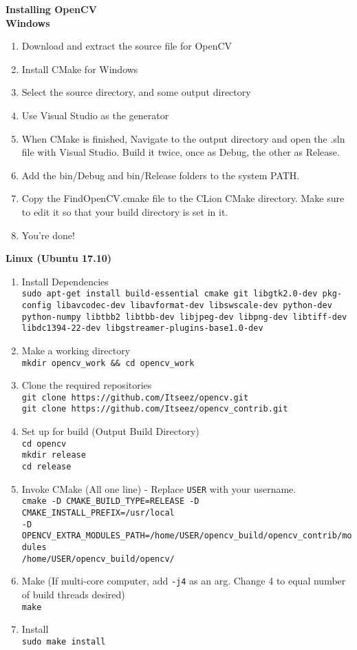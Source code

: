 \documentclass[11pt,letterpaper]{article}
\begin{document}
	\noindent\textbf{Installing OpenCV}\\
	\textbf{Windows}
	\begin{enumerate}
		\item Download and extract the source file for OpenCV
		\item Install CMake for Windows 
		\item Select the source directory, and some output directory
		\item Use Visual Studio as the generator
		\item When CMake is finished, Navigate to the output directory and open the .sln file with Visual Studio. Build it twice, once as Debug, the other as Release. 
		\item Add the bin/Debug and bin/Release folders to the system PATH. 
		\item Copy the FindOpenCV.cmake file to the CLion CMake directory. Make sure to edit it so that your build directory is set in it.
		\item You're done!
	\end{enumerate}
	\textbf{Linux (Ubuntu 17.10)}
	\begin{enumerate}
		\item Install Dependencies\\
		\texttt{sudo apt-get install build-essential cmake git libgtk2.0-dev pkg-config libavcodec-dev libavformat-dev libswscale-dev python-dev python-numpy libtbb2 libtbb-dev libjpeg-dev libpng-dev libtiff-dev libdc1394-22-dev libgstreamer-plugins-base1.0-dev}
		\item Make a working directory\\
		\texttt{mkdir opencv\_work \&\& cd opencv\_work}
		\item Clone the required repositories\\
		\texttt{git clone https://github.com/Itseez/opencv.git}\\
		\texttt{git clone https://github.com/Itseez/opencv\_contrib.git}
		\item Set up for build (Output Build Directory)\\
		\texttt{cd opencv\\
			mkdir release\\
			cd release}
		\item Invoke CMake (All one line) - Replace \texttt{USER} with your username.\\
		\texttt{cmake -D CMAKE\_BUILD\_TYPE=RELEASE -D CMAKE\_INSTALL\_PREFIX=/usr/local \\-D OPENCV\_EXTRA\_MODULES\_PATH=/home/{USER}/opencv\_build/opencv\_contrib/modules\\/home/{USER}/opencv\_build/opencv/}
		\item Make (If multi-core computer, add \texttt{-j4} as an arg. Change 4 to equal number of build threads desired)\\
		\texttt{make}
		\item Install\\
		\texttt{sudo make install}
	\end{enumerate}
\end{document}
